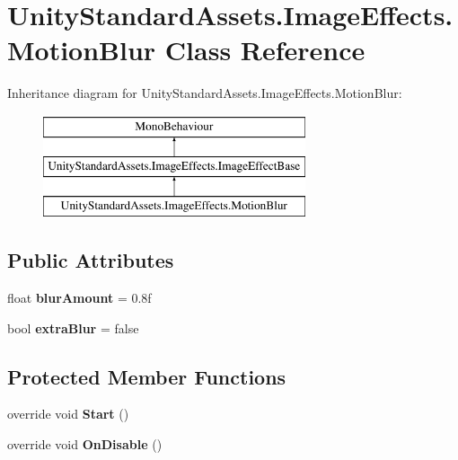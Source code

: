 \hypertarget{class_unity_standard_assets_1_1_image_effects_1_1_motion_blur}{}\section{Unity\+Standard\+Assets.\+Image\+Effects.\+Motion\+Blur Class Reference}
\label{class_unity_standard_assets_1_1_image_effects_1_1_motion_blur}
Inheritance diagram for Unity\+Standard\+Assets.\+Image\+Effects.\+Motion\+Blur\+:\begin{figure}[H]
\begin{center}
\leavevmode
\includegraphics[height=3.000000cm]{class_unity_standard_assets_1_1_image_effects_1_1_motion_blur}
\end{center}
\end{figure}
\subsection*{Public Attributes}
\begin{DoxyCompactItemize}
\item 
float {\bfseries blur\+Amount} = 0.\+8f\hypertarget{class_unity_standard_assets_1_1_image_effects_1_1_motion_blur_a54733adc5aa5771813151c4e8997fa87}{}\label{class_unity_standard_assets_1_1_image_effects_1_1_motion_blur_a54733adc5aa5771813151c4e8997fa87}

\item 
bool {\bfseries extra\+Blur} = false\hypertarget{class_unity_standard_assets_1_1_image_effects_1_1_motion_blur_aa0a8ae7dbf75b8ca6157a37fd87d299d}{}\label{class_unity_standard_assets_1_1_image_effects_1_1_motion_blur_aa0a8ae7dbf75b8ca6157a37fd87d299d}

\end{DoxyCompactItemize}
\subsection*{Protected Member Functions}
\begin{DoxyCompactItemize}
\item 
override void {\bfseries Start} ()\hypertarget{class_unity_standard_assets_1_1_image_effects_1_1_motion_blur_a70794816583f9b26550755153bdb85c3}{}\label{class_unity_standard_assets_1_1_image_effects_1_1_motion_blur_a70794816583f9b26550755153bdb85c3}

\item 
override void {\bfseries On\+Disable} ()\hypertarget{class_unity_standard_assets_1_1_image_effects_1_1_motion_blur_a2ad7688bd3a705deb52d448fdf6a0c31}{}\label{class_unity_standard_assets_1_1_image_effects_1_1_motion_blur_a2ad7688bd3a705deb52d448fdf6a0c31}

\end{DoxyCompactItemize}
